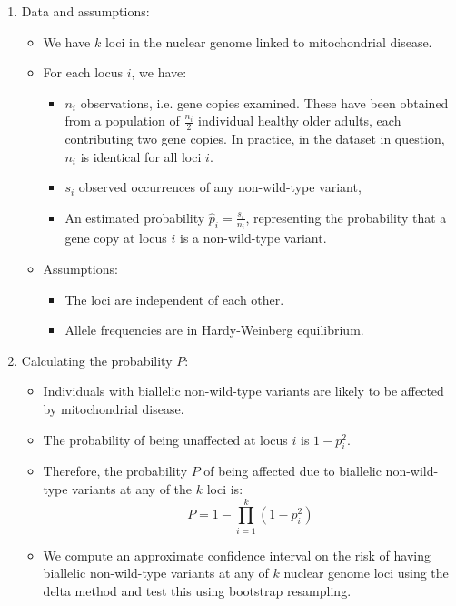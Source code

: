 \documentclass{article}
\begin{document}
\begin{enumerate}
\item Data and assumptions:
\begin{itemize}
    \item We have \( k \) loci in the nuclear genome linked to mitochondrial disease.
    \item For each locus \( i \), we have:
    \begin{itemize}
        \item \( n_i \) observations, i.e. gene copies examined. These have been obtained from a population of $\frac{n_i}{2}$ individual healthy older adults, each contributing two gene copies. In practice, in the dataset in question, $n_i$ is identical for all loci $i$.
        \item \( s_i \) observed occurrences of any non-wild-type variant,
        \item An estimated probability \( \hat{p}_i = \frac{s_i}{n_i} \), representing the probability that a gene copy at locus $i$ is a non-wild-type variant.
    \end{itemize}
    \item Assumptions:
    \begin{itemize}
    \item The loci are independent of each other.
    \item Allele frequencies are in Hardy-Weinberg equilibrium.
    \end{itemize}
\end{itemize}
\item Calculating the probability $P$:
\begin{itemize}
\item Individuals with biallelic non-wild-type variants are likely to be affected by mitochondrial disease.
\item The probability of being unaffected at locus $i$ is $1 - p_i^2$.
\item Therefore, the probability \( P \) of being affected due to biallelic non-wild-type variants at any of the \( k \) loci is:
    \[
    P = 1 - \prod_{i=1}^{k} (1 - p_i^2)
    \]
\item We compute an approximate confidence interval on the risk of having biallelic non-wild-type variants at any of $k$ nuclear genome loci using the delta method and test this using bootstrap resampling.
\end{itemize}
\end{enumerate}
\end{document}
